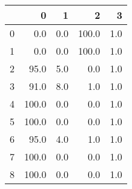 \begin{tabular}{lrrrr}
\toprule
{} &      0 &    1 &      2 &    3 \\
\midrule
0 &    0.0 &  0.0 &  100.0 &  1.0 \\
1 &    0.0 &  0.0 &  100.0 &  1.0 \\
2 &   95.0 &  5.0 &    0.0 &  1.0 \\
3 &   91.0 &  8.0 &    1.0 &  1.0 \\
4 &  100.0 &  0.0 &    0.0 &  1.0 \\
5 &  100.0 &  0.0 &    0.0 &  1.0 \\
6 &   95.0 &  4.0 &    1.0 &  1.0 \\
7 &  100.0 &  0.0 &    0.0 &  1.0 \\
8 &  100.0 &  0.0 &    0.0 &  1.0 \\
\bottomrule
\end{tabular}
